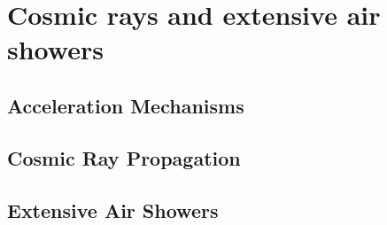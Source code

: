 
\pagestyle{fancy}
\fancyhead{}

\chapter{Cosmic rays and extensive air showers}
\label{chap:cosmic-rays}



\section{Acceleration Mechanisms}
\label{sec:cr-accelerators}



\section{Cosmic Ray Propagation}
\label{sec:cr-propagation}



\section{Extensive Air Showers}
\label{sec:extensive-air-showers}

